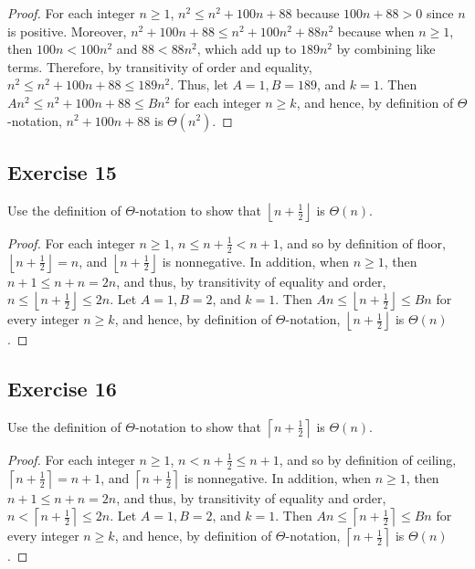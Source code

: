 \documentclass[14pt]{extarticle}
\newcommand{\dps}{\displaystyle}
\newcommand{\floor}[1]{{\left\lfloor#1\right\rfloor}}
\newcommand{\ceil}[1]{{\left\lceil#1\right\rceil}}
\begin{document}
\begin{proof}
    For each integer \(n \geq 1\), \(n^2 \leq n^2 + 100n + 88\) because \(100n + 88 > 0\) since \(n\) is positive. Moreover,
    \(n^2 + 100n + 88 \leq n^2 + 100n^2 + 88n^2\) because when \(n \geq 1\), then \(100n < 100n^2\) and \(88 < 88n^2\), which add
    up to \(189n^2\) by combining like terms. Therefore, by transitivity of order and equality, \(n^2 \leq n^2 + 100n + 88 \leq 189n^2\). Thus, let \(A = 1, B = 189\), and \(k = 1\). Then \(An^2 \leq n^2 + 100n + 88 \leq Bn^2\) for each integer
    \(n \geq k\), and hence, by definition of \(\Theta\)-notation, \(n^2 + 100n + 88\) is \(\Theta(n^2)\).
\end{proof}

\subsection{Exercise 15}
Use the definition of \(\Theta\)-notation to show that \(\dps \floor{n + \frac{1}{2}}\) is \(\Theta(n)\).

\begin{proof}
    For each integer \(n \geq 1\), \(\dps n \leq n + \frac{1}{2} < n+1\), and so by definition of floor, \(\dps \floor{n +
        \frac{1}{2}} = n\), and \(\dps \floor{n + \frac{1}{2}}\) is nonnegative. In addition, when \(n \geq 1\), then \(n + 1 \leq
    n + n = 2n\), and thus, by transitivity of equality and order, \(\dps n \leq \floor{n + \frac{1}{2}} \leq 2n\).
    Let \(A = 1, B = 2\), and \(k = 1\). Then \(\dps An\leq \floor {n+\frac{1}{2}}\leq Bn\) for every integer \(n \geq k\),
    and hence, by definition of \(\Theta\)-notation, \(\dps \floor {n+\frac{1}{2}}\) is \(\Theta(n)\).
\end{proof}

\subsection{Exercise 16}
Use the definition of \(\Theta\)-notation to show that \(\dps \ceil{n + \frac{1}{2}}\) is \(\Theta(n)\).

\begin{proof}
    For each integer \(n \geq 1\), \(\dps n < n + \frac{1}{2} \leq n+1\), and so by definition of ceiling, \(\dps \ceil{n +
        \frac{1}{2}} = n+1\), and \(\dps \ceil{n + \frac{1}{2}}\) is nonnegative. In addition, when \(n \geq 1\), then \(n + 1 \leq
    n + n = 2n\), and thus, by transitivity of equality and order, \(\dps n < \ceil{n + \frac{1}{2}} \leq 2n\).
    Let \(A = 1, B = 2\), and \(k = 1\). Then \(\dps An\leq \ceil{n+\frac{1}{2}}\leq Bn\) for every integer \(n \geq k\),
    and hence, by definition of \(\Theta\)-notation, \(\dps \ceil {n+\frac{1}{2}}\) is \(\Theta(n)\).
\end{proof}
\end{document}
